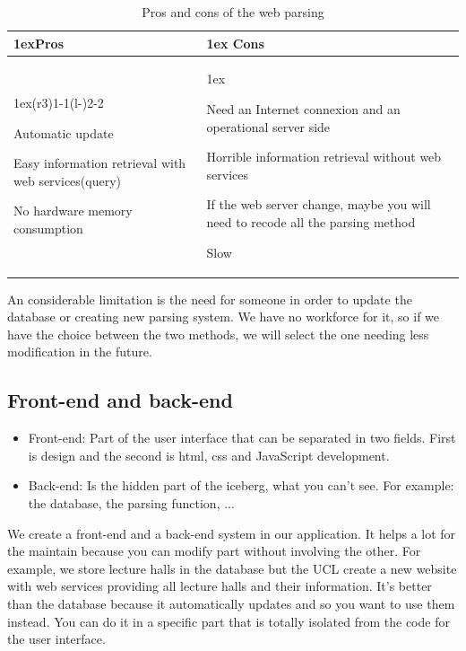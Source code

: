 \documentclass{eplmastersthesis}
\begin{document}
\begin{table}[H]
\begin{tabularx}{\linewidth}{>{\parskip1ex}X@{\kern4\tabcolsep}>{\parskip1ex}X}
\toprule
\hfil\bfseries Pros
&
\hfil\bfseries Cons
\\\cmidrule(r{3\tabcolsep}){1-1}\cmidrule(l{-\tabcolsep}){2-2}

Automatic update\par
Easy information retrieval with web services(query)\par
No hardware memory consumption\par

&

Need an Internet connexion and an operational server side\par
Horrible information retrieval without web services\par
If the web server change, maybe you will need to recode all the parsing method\par
Slow\par


\\\bottomrule
\end{tabularx}
\caption{Pros and cons of the web parsing}
\end{table}


An considerable limitation is the need for someone in order to update the database or creating new parsing system. We have no workforce for it, so if we have the choice between the two methods, we will select the one needing less modification in the future.

\subsection{Front-end and back-end}

\begin{itemize}
\item Front-end: Part of the user interface that can be separated in two fields. First is design and the second is html, css and JavaScript development.
\item Back-end: Is the hidden part of the iceberg, what you can't see. For example: the database, the parsing function, ...
\end{itemize}

We create a front-end and a back-end system in our application. It helps a lot for the maintain because you can modify part without involving the other. For example, we store lecture halls in the database but the UCL create a new website with web services providing all lecture halls and their information. It's better than the database because it automatically updates and so you want to use them instead. You can do it in a specific part that is totally isolated from the code for the user interface.	
\end{document}
